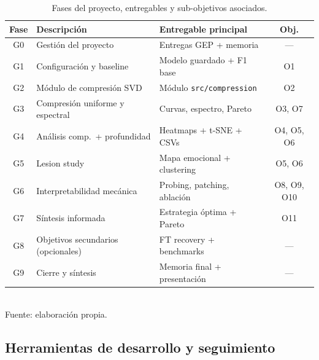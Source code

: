 \documentclass[11pt, a4paper]{article}
\begin{document}
\begin{table}[H]
    \centering
    \caption{Fases del proyecto, entregables y sub-objetivos asociados.}
    \label{tab:fases}
    \small
    \begin{tabular}{@{}c l l c@{}}
        \toprule
        \textbf{Fase} & \textbf{Descripción} & \textbf{Entregable principal} & \textbf{Obj.} \\
        \midrule
        G0 & Gestión del proyecto              & Entregas GEP + memoria          & --- \\
        G1 & Configuración y baseline           & Modelo guardado + F1 base       & O1 \\
        G2 & Módulo de compresión SVD           & Módulo \texttt{src/compression}  & O2 \\
        G3 & Compresión uniforme y espectral    & Curvas, espectro, Pareto        & O3, O7 \\
        G4 & Análisis comp.\ + profundidad      & Heatmaps + t-SNE + CSVs         & O4, O5, O6 \\
        G5 & Lesion study                       & Mapa emocional + clustering     & O5, O6 \\
        G6 & Interpretabilidad mecánica         & Probing, patching, ablación     & O8, O9, O10 \\
        G7 & Síntesis informada                 & Estrategia óptima + Pareto      & O11 \\
        G8 & Objetivos secundarios (opcionales) & FT recovery + benchmarks        & --- \\
        G9 & Cierre y síntesis                  & Memoria final + presentación    & --- \\
        \bottomrule
    \end{tabular}
    \\[0.15cm]{\small Fuente: elaboración propia.}
\end{table}

\subsection{Herramientas de desarrollo y seguimiento}
\label{sec:herramientas}
\end{document}
